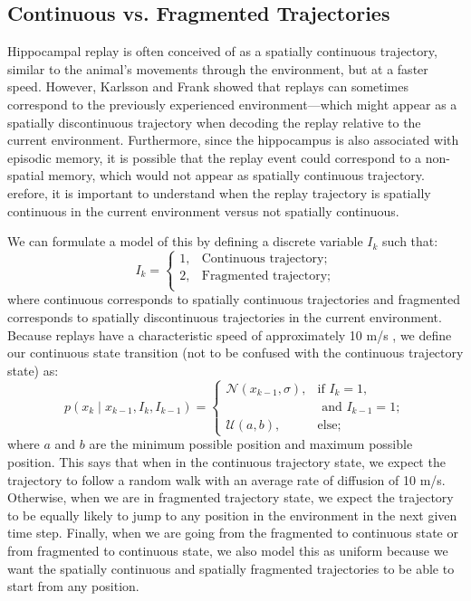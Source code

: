 \documentclass[conference]{IEEEtran}
\begin{document}
\subsection{Continuous vs. Fragmented Trajectories}
Hippocampal replay is often conceived of as a spatially continuous trajectory, similar to the animal's movements through the environment, but at a faster speed. However, Karlsson and Frank \cite{KarlssonAwakereplayremote2009} showed that replays can sometimes correspond to the previously experienced environment---which might appear as a spatially discontinuous trajectory when decoding the replay relative to the current environment. Furthermore, since the hippocampus is also associated with episodic memory, it is possible that the replay event could correspond to a non-spatial memory, which would not appear as spatially continuous trajectory. erefore, it is important to understand when the replay trajectory is spatially continuous in the current environment versus not spatially continuous.

We can formulate a model of this by defining a discrete variable $I_{k}$ such that:
\begin{equation}
    I_{k} = \begin{cases}
        1, & \text{Continuous trajectory};\\
        2, & \text{Fragmented trajectory};\\
         \end{cases}
\end{equation}
where continuous corresponds to spatially continuous trajectories and fragmented corresponds to spatially discontinuous trajectories in the current environment. Because replays have a characteristic speed of approximately 10 m/s \cite{DavidsonHippocampalReplayExtended2009}, we define our continuous state transition (not to be confused with the continuous trajectory state) as:
\begin{equation}
    p(x_{k} \mid x_{k-1}, I_{k}, I_{k-1}) = \begin{cases}
        \mathcal{N}(x_{k-1}, \sigma), & \text{if } I_{k}=1, \\
         & \text{ and } I_{k-1}=1;\\
        \mathcal{U}(a, b), & \text{else;}
    \end{cases}        
\end{equation}
where $a$ and $b$ are the minimum possible position and maximum possible position. This says that when in the continuous trajectory state, we expect the trajectory to follow a random walk with an average rate of diffusion of 10 m/s. Otherwise, when we are in fragmented trajectory state, we expect the trajectory to be equally likely to jump to any position in the environment in the next given time step. Finally, when we are going from the fragmented to continuous state or from fragmented to continuous state, we also model this as uniform because we want the spatially continuous and spatially fragmented trajectories to be able to start from any position.
\end{document}
